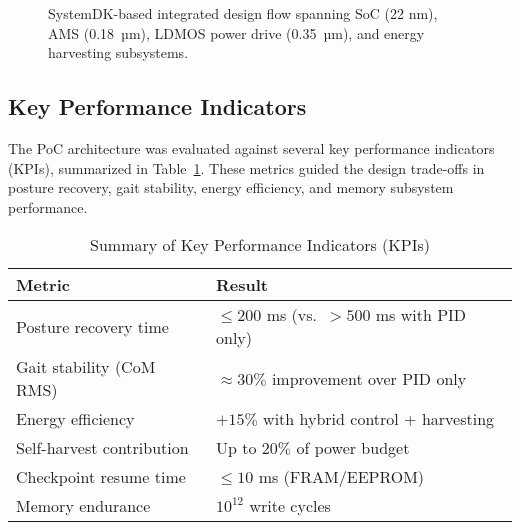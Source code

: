 \begin{figure}[t]
  \centering
  \caption{SystemDK-based integrated design flow spanning SoC (22 nm), AMS (0.18~µm),
  LDMOS power drive (0.35~µm), and energy harvesting subsystems.}
  \label{fig:systemdk_flow}
\end{figure}

\subsection{Key Performance Indicators}
The PoC architecture was evaluated against several key performance indicators (KPIs),
summarized in Table~\ref{tab:kpi_summary}. These metrics guided the design trade-offs
in posture recovery, gait stability, energy efficiency, and memory subsystem performance.

\begin{table}[t]
\caption{Summary of Key Performance Indicators (KPIs)}
\label{tab:kpi_summary}
\centering
\renewcommand{\arraystretch}{1.15}
\footnotesize
\begin{tabular}{@{}p{} p{}@{}}
\toprule
\textbf{Metric} & \textbf{Result} \\
\midrule
Posture recovery time & $\leq 200$ ms (vs.\ $>500$ ms with PID only) \\
Gait stability (CoM RMS) & $\approx 30\%$ improvement over PID only \\
Energy efficiency & $+15\%$ with hybrid control + harvesting \\
Self-harvest contribution & Up to $20\%$ of power budget \\
Checkpoint resume time & $\leq 10$ ms (FRAM/EEPROM) \\
Memory endurance & $10^{12}$ write cycles \\
\bottomrule
\end{tabular}
\end{table}
